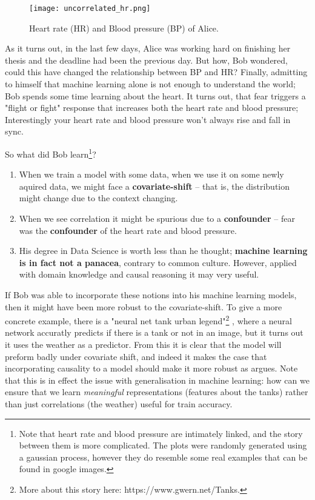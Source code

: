 \begin{figure}[H]
    \centering
    \texttt{[image: uncorrelated\_hr.png]}
    \caption{Heart rate (HR) and Blood pressure (BP) of Alice.}
\end{figure}

As it turns out, in the last few days, Alice was working hard on finishing her thesis and the deadline had been 
the previous day. But how, Bob wondered, could this have changed the relationship between BP and HR? 
Finally, admitting to himself that machine learning alone is not enough to understand the world; 
Bob spends some time learning about the heart. It turns out, that fear triggers a "flight or fight"
response that increases both the heart rate and blood pressure; Interestingly your heart rate and blood pressure 
won’t always rise and fall in sync.

So what did Bob learn\footnote{
    Note that heart rate and blood pressure are intimately linked, and the story between them is more complicated.
    The plots were randomly generated using a gaussian process, however they do resemble some real examples that 
    can be found in google images.
}?

\begin{enumerate}
    \item When we train a model with some data, when we use it on some newly aquired data, we might
    face a \textbf{covariate-shift} -- that is, the distribution might change due to the context changing.
    \item When we see correlation it might be spurious due to a \textbf{confounder} -- fear was the \textbf{confounder} 
    of the heart rate and blood pressure.
    \item His degree in Data Science is worth less than he thought; \textbf{machine learning is in fact not 
    a panacea}, contrary to common culture. However, applied with domain knowledge and causal reasoning
    it may very useful. 
\end{enumerate}

If Bob was able to incorporate these notions into his machine learning models, then it might have been more
robust to the covariate-shift. To give a more concrete example, there is a "neural net tank urban legend"\footnote{
    More about this story here: https://www.gwern.net/Tanks.
}
, where a neural network accuratly predicts if there is a tank or not in an image, but it turns out it uses the 
weather as a predictor. From this it is clear that the model will preform badly under covariate shift, and indeed
it makes the case that incorporating causality to a model should make it more robust as
\cite{scholkopf2019causality} argues. Note that this is in effect the issue with generalisation in machine learning:
how can we ensure that we learn \textit{meaningful} representations (features about the tanks) rather than just
correlations (the weather) useful for train accuracy. 

